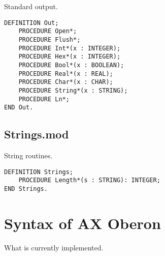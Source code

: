 \documentclass[12pt]{article}
\begin{document}
Standard output.

\begin{lstlisting}[style=oberon]
DEFINITION Out;
    PROCEDURE Open*;
    PROCEDURE Flush*;
    PROCEDURE Int*(x : INTEGER);
    PROCEDURE Hex*(x : INTEGER); 
    PROCEDURE Bool*(x : BOOLEAN);
    PROCEDURE Real*(x : REAL);
    PROCEDURE Char*(x : CHAR);
    PROCEDURE String*(x : STRING);
    PROCEDURE Ln*;
END Out.
\end{lstlisting} 

\subsection{Strings.mod}

String routines.

\begin{lstlisting}[style=oberon]
DEFINITION Strings;
    PROCEDURE Length*(s : STRING): INTEGER;
END Strings.
\end{lstlisting} 


\newpage
\appendix

\section{Syntax of AX Oberon}

What is currently implemented.
\end{document}
